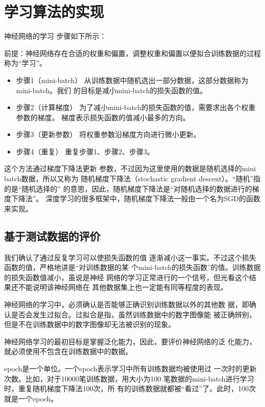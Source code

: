 \section{学习算法的实现}
神经网络的学习
步骤如下所示：

前提：神经网络存在合适的权重和偏置，调整权重和偏置以便拟合训练数据的过程称为“学习”。
\begin{itemize}
    \item 步骤1（mini-batch）
          从训练数据中随机选出一部分数据，这部分数据称为mini-batch。我们
          的目标是减小mini-batch的损失函数的值。
    \item 步骤2（计算梯度）
          为了减小mini-batch的损失函数的值，需要求出各个权重参数的梯度。
          梯度表示损失函数的值减小最多的方向。
    \item 步骤3（更新参数）
          将权重参数沿梯度方向进行微小更新。
    \item 步骤4（重复）
          重复步骤1、步骤2、步骤3。
\end{itemize}

这个方法通过梯度下降法更新
参数，不过因为这里使用的数据是随机选择的mini batch数据，所以又称为
随机梯度下降法（stochastic gradient descent）。“随机”指的是“随机选择的”
的意思，因此，随机梯度下降法是“对随机选择的数据进行的梯度下降法”。
深度学习的很多框架中，随机梯度下降法一般由一个名为SGD的函数来实现。

\subsection{基于测试数据的评价}
我们确认了通过反复学习可以使损失函数的值
逐渐减小这一事实。不过这个损失函数的值，严格地讲是“对训练数据的某
个mini-batch的损失函数”的值。训练数据的损失函数值减小，虽说是神经
网络的学习正常进行的一个信号，但光看这个结果还不能说明该神经网络在
其他数据集上也一定能有同等程度的表现。

神经网络的学习中，必须确认是否能够正确识别训练数据以外的其他数
据，即确认是否会发生过拟合。过拟合是指，虽然训练数据中的数字图像能
被正确辨别，但是不在训练数据中的数字图像却无法被识别的现象。

神经网络学习的最初目标是掌握泛化能力，因此，要评价神经网络的泛
化能力，就必须使用不包含在训练数据中的数据。

\begin{tcolorbox}
    epoch是一个单位。一个epoch表示学习中所有训练数据均被使用过
    一次时的更新次数。比如，对于10000笔训练数据，用大小为100
    笔数据的mini-batch进行学习时，重复随机梯度下降法100次，所
    有的训练数据就都被“看过”了。此时，100次就是一个epoch。
\end{tcolorbox}